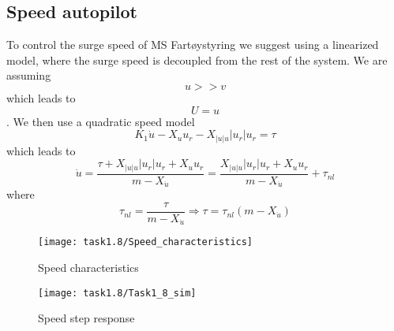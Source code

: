 \subsection{Speed autopilot}\label{subsec:prob1.2}
To control the surge speed of MS Fartøystyring we suggest using a linearized model, where the surge speed is decoupled from the rest of the system. We are assuming $$u>>v$$ which leads to $$U=u$$.
We then use a quadratic speed model
\begin{equation}
K_1 \dot{u} - X_u u_r - X_{|u| u} |u_r| u_r=\tau
\end{equation}
which leads to
\begin{equation}
\dot{u} = \frac{ \tau + X_{|u|u} |u_r| u_r +X_u u_r }{ m-X_{\dot{u}} } 
= \frac{X_{|u|u} |u_r| u_r +X_u u_r }{ m-X_{\dot{u}} } + \tau_{nl}
\end{equation}
where
\begin{equation}
\tau_{nl}  = \frac{ \tau}{ m-X_{\dot{u}} } \Rightarrow \tau = \tau_{nl}(m-X_{\dot{u}})
\end{equation}

\begin{figure}[H]
    \centering
    \texttt{[image: task1.8/Speed\_characteristics]}
    \caption{Speed characteristics}
    \label{fig:1.8-speed}
\end{figure}

\begin{figure}[H]
    \centering
    \texttt{[image: task1.8/Task1\_8\_sim]}
    \caption{Speed step response}
    \label{fig:1.8-step}
\end{figure}